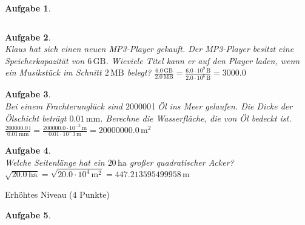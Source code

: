 \documentclass[11pt,fleqn]{article}
\theoremstyle{aufg}
\newtheorem{aufgabe}{Aufgabe}
\theoremstyle{bsp}
\begin{document}
\begin{flushleft}
\begin{aufgabe}
\begin{tabular}{c|c|c|c|c|c|c}
\end{tabular} 

\end{aufgabe} 
\begin{aufgabe} ~ \\ 
Klaus hat sich einen neuen MP3-Player gekauft. Der MP3-Player besitzt eine Speicherkapazit\"at von $6\mathrm{\,GB}$. Wieviele Titel kann er auf den Player laden, wenn ein Musikst\"uck im Schnitt $2\mathrm{\,MB}$ belegt? 
$\frac{6.0\mathrm{\,GB}}{2.0\mathrm{\,MB}} = \frac{6.0\cdot 10^9\mathrm{\,B}}{2.0\cdot 10^6\mathrm{\,B}}=3000.0\mathrm{\,}$\end{aufgabe} 
\begin{aufgabe} ~ \\ 
Bei einem Frachterungl\"uck sind $200000\mathrm{\,l}$ \"Ol ins Meer gelaufen. Die Dicke der \"Olschicht betr\"agt $0.01\mathrm{\,mm}$. Berechne die Wasserfl\"ache, die von \"Ol bedeckt ist.
$\frac{200000.0\mathrm{\,l}}{0.01\mathrm{\,mm}} = \frac{200000.0\cdot 10^{-3}\mathrm{\,m}}{0.01\cdot 10^-3\mathrm{\,m}}=20000000.0\mathrm{\,m}^2$\end{aufgabe} 
\begin{aufgabe} ~ \\ 
Welche Seitenl\"ange hat ein $20\mathrm{\,ha}$ gro\ss{}er quadratischer Acker?
$\sqrt{20.0\mathrm{\,ha}}=\sqrt{20.0\cdot 10^4\mathrm{\,m}^2}=447.213595499958\mathrm{\,m}$\end{aufgabe} 
\begin{center} \begin{framed} Erh\"ohtes Niveau (4 Punkte) \end{framed} \end{center}\begin{aufgabe} ~ \\ 

\end{aufgabe}
\end{flushleft}
\end{document}

